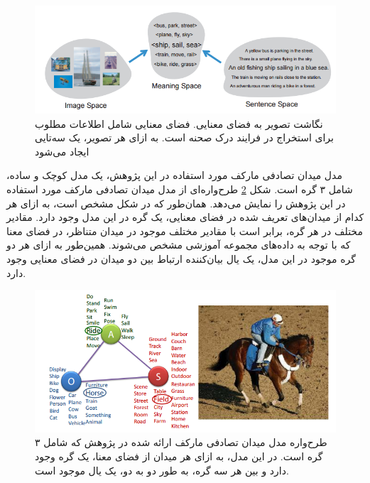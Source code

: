 \begin{figure}[h]
\center
\includegraphics[scale=0.7]{./Imgs/farhadi2010every_fig1.png}
\caption{
نگاشت تصویر به فضای معنایی. فضای معنایی شامل اطلاعات مطلوب برای استخراج در فرایند درک صحنه است. به ازای هر تصویر، یک سه‌تایی ایجاد می‌شود\cite{Farhadi2010every.}
}
\label{fig:F2010EF1}
\end{figure}

مدل میدان تصادفی مارکف مورد استفاده در این پژوهش، یک مدل کوچک و ساده، شامل ۳ گره است. شکل \ref{fig:F2010EF2}
طرح‌واره‌ای از مدل میدان تصادفی مارکف مورد استفاده در این پژوهش را نمایش می‌دهد. همان‌طور که در شکل مشخص است،  به ازای هر کدام از میدان‌های تعریف شده در فضای معنایی، یک گره در این مدل وجود دارد. مقادیر مختلف در هر گره، برابر است با مقادیر مختلف موجود در میدان متناظر، در فضای معنا که با توجه به داده‌های مجموعه‌‌ ‌آموزشی مشخص می‌شوند. همین‌طور به ازای هر دو گره موجود در این مدل، یک یال بیان‌کننده ارتباط بین دو میدان در فضای معنایی وجود دارد.

\begin{figure}[H]
\center
\includegraphics[scale=0.7]{./Imgs/farhadi2010every_fig2.png}
\caption{
طرح‌واره مدل میدان تصادفی مارکف ارائه شده در پژوهش \cite{Farhadi2010every} که شامل ۳ گره است. در این مدل، به ازای هر میدان از فضای معنا، یک گره وجود دارد و بین هر سه گره‌، به طور دو به دو، یک یال موجود است\cite{Farhadi2010every}.
}
\label{fig:F2010EF2}
\end{figure}

